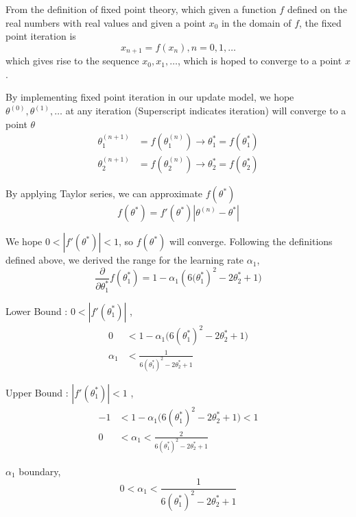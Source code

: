 \documentclass[12pt,a4paper]{article}%
\theoremstyle{definition}
\theoremstyle{plain}
\numberwithin{equation}{section}
\begin{document}
From the definition of fixed point theory, which given a function $f$ defined on the real numbers with real values and given a point $x_{0}$ in the domain of $f$, the fixed point iteration is
\begin{equation}
x_{n+1} = f(x_{n}), n=0,1,\dots
\end{equation}
which gives rise to the sequence $x_{0},x_{1},\dots$, which is hoped to converge to a point $x$. 


By implementing fixed point iteration in our update model, we hope  $\theta^{(0)},\theta^{(1)},\dots$ at any iteration (Superscript indicates iteration) will converge to a point $\theta$
\begin{align*}
\theta_{1}^{(n+1)} &=  f(\theta_{1}^{(n)}) \rightarrow \theta_{1}^{*} =  f(\theta_{1}^{*}) \\
\theta_{2}^{(n+1)} &=  f(\theta_{2}^{(n)}) \rightarrow \theta_{2}^{*} =  f(\theta_{2}^{*})
\end{align*}

By applying Taylor series, we can approximate $f(\theta^{*})$
\begin{equation*}
f(\theta^{*}) = f'(\theta^{*}) |\theta^{(n)}-\theta^{*}|
\end{equation*}

We hope $0<|f'(\theta^{*})|<1$, so $f(\theta^{*})$ will converge. Following the definitions defined above, we derived the range for the learning rate $\alpha_{1}$, 
\begin{equation*}
\frac{\partial}{\partial \theta_{1}^{*}}f(\theta_{1}^{*}) = 1 - \alpha_{1} (6\big(\theta_{1}^{*})^{2} - 2 \theta_{2}^{*}+1 \big)
\end{equation*}

Lower Bound : $0<|f'(\theta_{1}^{*})|$ , 
\begin{align*}
0 &< 1 - \alpha_{1} \big(6(\theta_{1}^{*})^{2} - 2 \theta_{2}^{*}+1 \big) \\
\alpha_{1} &< \frac{1}{6(\theta_{1}^{*})^{2} - 2 \theta_{2}^{*}+1}
\end{align*}


Upper Bound : $|f'(\theta_{1}^{*})|<1$ , 
\begin{align*}
-1 &< 1 - \alpha_{1} \big(6(\theta_{1}^{*})^{2} - 2 \theta_{2}^{*}+1 \big) < 1 \\
0 &< \alpha_{1} < \frac{2}{6(\theta_{1}^{*})^{2} - 2 \theta_{2}^{*}+1}
\end{align*}

$\alpha_{1}$ boundary,
\begin{equation*}
0 < \alpha_{1} < \frac{1}{6(\theta_{1}^{*})^{2} - 2 \theta_{2}^{*}+1}
\end{equation*}
\end{document}
